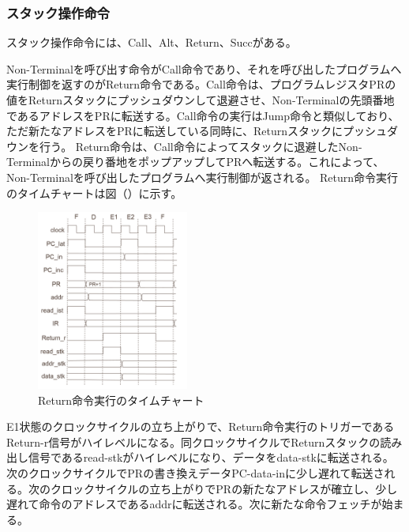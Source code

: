 \documentclass[paper]{ieicej}
\begin{document}
\subsubsection{スタック操作命令}
スタック操作命令には、Call、Alt、Return、Succがある。

Non-Terminalを呼び出す命令がCall命令であり、それを呼び出したプログラムへ実行制御を返すのがReturn命令である。Call命令は、プログラムレジスタPRの値をReturnスタックにプッシュダウンして退避させ、Non-Terminalの先頭番地であるアドレスをPRに転送する。Call命令の実行はJump命令と類似しており、ただ新たなアドレスをPRに転送している同時に、Returnスタックにプッシュダウンを行う。
Return命令は、Call命令によってスタックに退避したNon-Terminalからの戻り番地をポップアップしてPRへ転送する。これによって、Non-Terminalを呼び出したプログラムへ実行制御が返される。
Return命令実行のタイムチャートは図（）に示す。

\begin{figure}[h]
    \begin{center}
        \includegraphics[width=50mm]{./fig/Return}
       \caption{Return命令実行のタイムチャート}
    \end{center}
\end{figure}

E1状態のクロックサイクルの立ち上がりで、Return命令実行のトリガーであるReturn-r信号がハイレベルになる。同クロックサイクルでReturnスタックの読み出し信号であるread-stkがハイレベルになり、データをdata-stkに転送される。次のクロックサイクルでPRの書き換えデータPC-data-inに少し遅れて転送される。次のクロックサイクルの立ち上がりでPRの新たなアドレスが確立し、少し遅れて命令のアドレスであるaddrに転送される。次に新たな命令フェッチが始まる。



\end{document}
